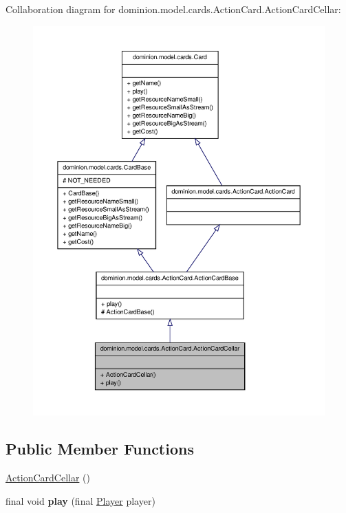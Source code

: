 \-Collaboration diagram for dominion.\-model.\-cards.\-Action\-Card.\-Action\-Card\-Cellar\-:
\nopagebreak
\begin{figure}[H]
\begin{center}
\leavevmode
\includegraphics[width=350pt]{classdominion_1_1model_1_1cards_1_1ActionCard_1_1ActionCardCellar__coll__graph}
\end{center}
\end{figure}
\subsection*{\-Public \-Member \-Functions}
\begin{DoxyCompactItemize}
\item 
\hyperlink{classdominion_1_1model_1_1cards_1_1ActionCard_1_1ActionCardCellar_a811640c0793601dfdaafbe74927bc4fe}{\-Action\-Card\-Cellar} ()
\item 
\hypertarget{classdominion_1_1model_1_1cards_1_1ActionCard_1_1ActionCardCellar_aa47ef7a26e076142e5be49925265234a}{final void {\bfseries play} (final \hyperlink{interfacedominion_1_1model_1_1Player}{\-Player} player)}\label{classdominion_1_1model_1_1cards_1_1ActionCard_1_1ActionCardCellar_aa47ef7a26e076142e5be49925265234a}

\end{DoxyCompactItemize}


